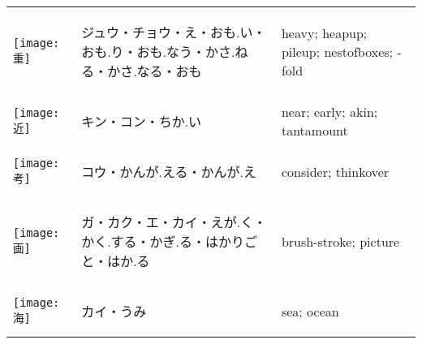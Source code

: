 \documentclass[a4paper,12pt]{extarticle}
\begin{document}
\begin{longtable}{|lp{6cm}p{4cm}|}
\begin{minipage}{0.3\textwidth}
{	\texttt{[image: 重]}
}
\end{minipage}
&
\begin{CJK}{UTF8}{min}ジュウ・チョウ・え・おも.い・おも.り・おも.なう・かさ.ねる・かさ.なる・おも\end{CJK}
&
heavy; heapup; pileup; nestofboxes; -fold
\\ 
\begin{minipage}{0.3\textwidth}
\centerline{
	\texttt{[image: 近]}
}
\end{minipage}
&
\begin{CJK}{UTF8}{min}キン・コン・ちか.い\end{CJK}
&
near; early; akin; tantamount
\\ 
\begin{minipage}{0.3\textwidth}
\centerline{
	\texttt{[image: 考]}
}
\end{minipage}
&
\begin{CJK}{UTF8}{min}コウ・かんが.える・かんが.え\end{CJK}
&
consider; thinkover
\\ 
\begin{minipage}{0.3\textwidth}
\centerline{
	\texttt{[image: 画]}
}
\end{minipage}
&
\begin{CJK}{UTF8}{min}ガ・カク・エ・カイ・えが.く・かく.する・かぎ.る・はかりごと・はか.る\end{CJK}
&
brush-stroke; picture
\\ 
\begin{minipage}{0.3\textwidth}
\centerline{
	\texttt{[image: 海]}
}
\end{minipage}
&
\begin{CJK}{UTF8}{min}カイ・うみ\end{CJK}
&
sea; ocean
\\ 

\end{longtable}
\end{document}
